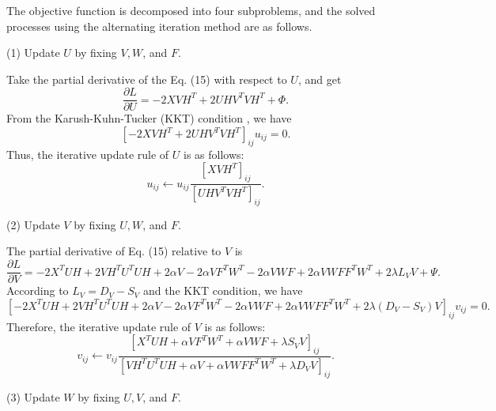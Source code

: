 \documentclass[a4paper,fleqn]{cas-sc}
\begin{document}
The objective function is decomposed into four subproblems, and the solved processes using the alternating iteration method are as follows.

(1) Update $U$ by fixing $V, W$, and $F$.

Take the partial derivative of the Eq. (15) with respect to $U$, and get
\begin{equation}
	\frac{\partial L}{\partial U}=-2 X V H^T+2 U H V^T V H^T+\Phi. 
\end{equation}
From the Karush-Kuhn-Tucker (KKT) condition \cite{29}, we have
\begin{equation}
	\left[-2 X V H^T+2 U H V^T V H^T\right]_{i j} u_{i j}=0.
\end{equation}
Thus, the iterative update rule of $U$ is as follows:
\begin{equation}
	u_{i j} \leftarrow u_{i j} \frac{\left[X V H^T\right]_{i j}}{\left[U H V^T V H^T\right]_{i j}}.
\end{equation}

(2) Update $V$ by fixing $U, W$, and $F$.

The partial derivative of Eq. (15) relative to $V$ is
\begin{equation}
	\frac{\partial L}{\partial V}=-2 X^T U H+2 V H^T U^T U H+2 \alpha V-2 \alpha V F^T W^T-2 \alpha V W F+2 \alpha V W F F^T W^T+2 \lambda L_V V+\Psi.
\end{equation}
According to $L_V=D_V-S_V$ and the KKT condition, we have
\begin{equation}
	\left[-2 X^T U H+2 V H^T U^T U H+2 \alpha V-2 \alpha V F^T W^T-2 \alpha V W F+2 \alpha V W F F^T W^T+2 \lambda\left(D_V-S_V\right) V\right]_{i j} v_{i j}=0.
\end{equation}
Therefore, the iterative update rule of $V$ is as follows:
\begin{equation}
	v_{i j} \leftarrow v_{i j} \frac{\left[X^T U H+ \alpha V F^T W^T+ \alpha V W F+\lambda S_V V\right]_{i j}}{\left[V H^T U^T U H+\alpha V+\alpha V W F F^T W^T+\lambda D_V V\right]_{i j}}.
\end{equation} 

(3) Update $W$ by fixing $U, V$, and $F$.
\end{document}
